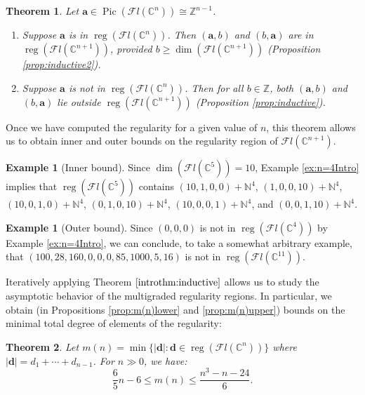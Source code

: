 \documentclass[12pt,reqno]{amsart}
\newtheorem{introtheorem}{Theorem}
\theoremstyle{definition}
\newtheorem{example}[theorem]{Example}
\theoremstyle{remark}
\newcommand{\reg}{\operatorname{reg}}
\newcommand{\calF}{{\mathcal{F}}}
\begin{document}
\begin{introtheorem}\label{introthm:inductive} Let $\mathbf a \in \operatorname{Pic}(\calF l(\mathbb C^n)) \cong \mathbb Z^{n-1}$.
\begin{enumerate}
    \item Suppose $\mathbf a$ is in $\reg(\calF l(\mathbb C^n))$.  Then $(\mathbf a,b)$ and $(b,\mathbf a)$ are in  $\reg(\calF l(\mathbb C^{n+1}))$, provided \newline $b \geq \dim(\calF l(\mathbb C^{n+1}))$ (Proposition \ref{prop:inductive2}).
    \item Suppose $\mathbf a$ is not in $\reg(\calF l(\mathbb C^n))$.  Then for all $b \in \mathbb Z$, both $(\mathbf a,b)$ and $(b,\mathbf a)$ lie outside $\reg(\calF l(\mathbb C^{n+1}))$ (Proposition \ref{prop:inductive}).
\end{enumerate}
\end{introtheorem}

Once we have computed the regularity for a given value of $n$, this theorem allows us to obtain inner and outer bounds on the regularity region of $\calF l(\mathbb C^{n+1})$.

\begin{example}[Inner bound]\label{ex:introInductiveInner}
Since $\dim(\calF l(\mathbb C^{5})) = 10$,  Example \ref{ex:n=4Intro} implies that
$\reg(\calF l(\mathbb C^{5}))$ contains $(10,1,0,0)+\mathbb N^4$, $(1,0,0,10)+\mathbb N^4$, $(10,0,1,0)+\mathbb N^4$, $(0,1,0,10)+\mathbb N^4$, $(10,0,0,1)+\mathbb N^4$, and $(0,0,1,10)+\mathbb N^4$.
\end{example}

\begin{example}[Outer bound]\label{ex:introInductiveOuter}
Since $(0,0,0)$ is not in $\reg(\calF l(\mathbb C^{4}))$ by Example \ref{ex:n=4Intro}, we can conclude, to take a somewhat arbitrary example, that $(100,28,160,0,0,0,85,1000,5,16)$ is not in $\reg(\calF l(\mathbb C^{11}))$.
\end{example}

Iteratively applying Theorem $\ref{introthm:inductive}$ allows us to study the asymptotic behavior of the multigraded regularity regions.  In particular, we obtain (in Propositions \ref{prop:m(n)lower} and \ref{prop:m(n)upper}) bounds on the minimal total degree of elements of the regularity:

\begin{introtheorem}\label{introthm:totalDeg}
    Let $m(n) = \min\{|\mathbf d|:\mathbf d \in \reg(\calF l(\mathbb C^{n}))\}$ where $|\mathbf d| = d_1+\cdots+d_{n-1}$. For $n \gg 0$, we have:
    \[
    \frac{6}{5}n - 6 \leq m(n) \leq \frac{n^3-n-24}{6}.
    \]
\end{introtheorem}
\end{document}
